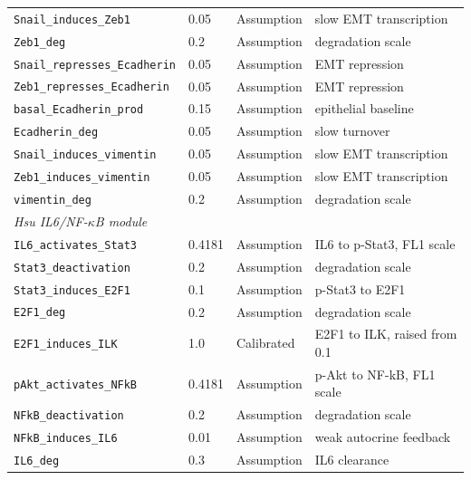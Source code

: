 \begin{longtable}{@{}llp{2.6cm}p{4.6cm}@{}}
\texttt{Snail\_induces\_Zeb1} & 0.05 & Assumption & slow EMT transcription \\
\texttt{Zeb1\_deg} & 0.2 & Assumption & degradation scale \\
\texttt{Snail\_represses\_Ecadherin} & 0.05 & Assumption & EMT repression \\
\texttt{Zeb1\_represses\_Ecadherin} & 0.05 & Assumption & EMT repression \\
\texttt{basal\_Ecadherin\_prod} & 0.15 & Assumption & epithelial baseline \\
\texttt{Ecadherin\_deg} & 0.05 & Assumption & slow turnover \\
\texttt{Snail\_induces\_vimentin} & 0.05 & Assumption & slow EMT transcription \\
\texttt{Zeb1\_induces\_vimentin} & 0.05 & Assumption & slow EMT transcription \\
\texttt{vimentin\_deg} & 0.2 & Assumption & degradation scale \\
\midrule
\multicolumn{4}{l}{\textit{Hsu IL6/NF-$\kappa$B module}} \\
\texttt{IL6\_activates\_Stat3} & 0.4181 & Assumption & IL6 to p-Stat3, FL1 scale \\
\texttt{Stat3\_deactivation} & 0.2 & Assumption & degradation scale \\
\texttt{Stat3\_induces\_E2F1} & 0.1 & Assumption & p-Stat3 to E2F1 \\
\texttt{E2F1\_deg} & 0.2 & Assumption & degradation scale \\
\texttt{E2F1\_induces\_ILK} & 1.0 & Calibrated & E2F1 to ILK, raised from 0.1 \\
\texttt{pAkt\_activates\_NFkB} & 0.4181 & Assumption & p-Akt to NF-kB, FL1 scale \\
\texttt{NFkB\_deactivation} & 0.2 & Assumption & degradation scale \\
\texttt{NFkB\_induces\_IL6} & 0.01 & Assumption & weak autocrine feedback \\
\texttt{IL6\_deg} & 0.3 & Assumption & IL6 clearance \\
\bottomrule
\end{longtable}


